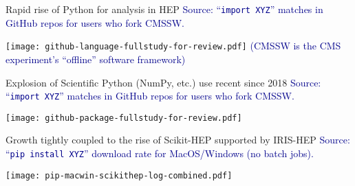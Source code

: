 \begin{frame}{Rapid rise of Python for analysis in HEP}
\vspace{0.25 cm}
\textcolor{darkblue}{Source: ``\texttt{import XYZ}'' matches in GitHub repos for users who fork CMSSW.}

\vspace{0.2 cm}
\texttt{[image: github-language-fullstudy-for-review.pdf]}
\textcolor{darkblue}{\tiny (CMSSW is the CMS experiment's ``offline'' software framework)}
\end{frame}

\begin{frame}{Explosion of Scientific Python (NumPy, etc.) use recent since 2018}
\vspace{0.25 cm}
\textcolor{darkblue}{Source: ``\texttt{import XYZ}'' matches in GitHub repos for users who fork CMSSW.}

\vspace{0.2 cm}
\texttt{[image: github-package-fullstudy-for-review.pdf]}
\end{frame}

\begin{frame}{Growth tightly coupled to the rise of Scikit-HEP supported by IRIS-HEP}
\vspace{0.25 cm}
\textcolor{darkblue}{Source: ``\texttt{pip install XYZ}'' download rate for MacOS/Windows (no batch jobs).}

\vspace{0.1 cm}
\texttt{[image: pip-macwin-scikithep-log-combined.pdf]}
\end{frame}

